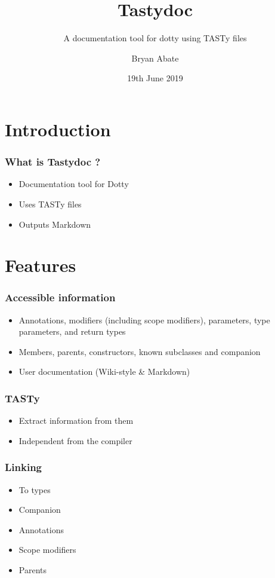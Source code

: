 \documentclass{beamer}
\title{Tastydoc}
\subtitle{A documentation tool for dotty using TASTy files}
\author{Bryan Abate}
\date{19th June 2019}
\begin{document}
 
\frame{\titlepage}


\section{Introduction}

\begin{frame}
\frametitle{What is Tastydoc ?}
\begin{itemize}
  \item Documentation tool for Dotty \pause
  \item Uses TASTy files \pause
  \item Outputs Markdown
\end{itemize}
\end{frame}
 
\section{Features}

\begin{frame}
  \frametitle{Accessible information}
  \begin{itemize}
    \item Annotations, modifiers (including scope modifiers), parameters, type parameters, and return types \pause
    \item Members, parents, constructors, known subclasses and companion \pause
    \item User documentation (Wiki-style \& Markdown)
  \end{itemize}
\end{frame}

\begin{frame}
  \frametitle{TASTy}
  \begin{itemize}
    \item Extract information from them \pause
    \item Independent from the compiler
  \end{itemize}
\end{frame}

\begin{frame}
  \frametitle{Linking}
  \begin{itemize}
    \item To types \pause
    \item Companion \pause
    \item Annotations \pause
    \item Scope modifiers \pause
    \item Parents
  \end{itemize}
\end{frame}
\end{document}
